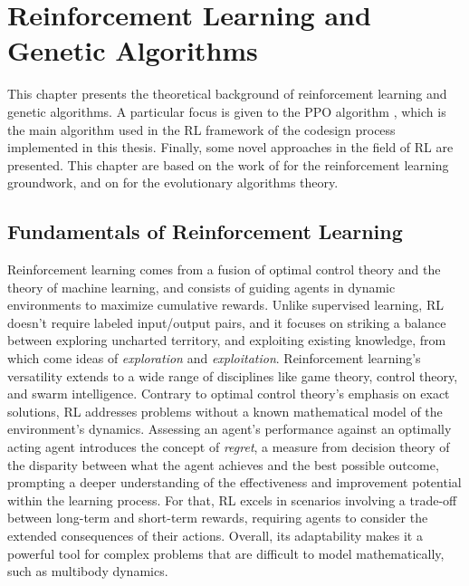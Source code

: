 \chapter{Reinforcement Learning and Genetic Algorithms}
\label{chp:back_RLGA}

This chapter presents the theoretical background of reinforcement learning and genetic algorithms. A particular focus is given to the \ac{PPO} algorithm \citep{schulman_proximal_2017}, which is the main algorithm used in the \ac{RL} framework of the codesign process implemented in this thesis. Finally, some novel approaches in the field of \ac{RL} are presented. This chapter are based on the work of \citet{sutton_reinforcement_1998,li_deep_2018,agarwal_deep_2022} for the reinforcement learning groundwork, and on \citep{holland_1992_ga} for the evolutionary algorithms theory.

\section{Fundamentals of Reinforcement Learning}

Reinforcement learning comes from a fusion of optimal control theory and the theory of machine learning, and consists of guiding agents in dynamic environments to maximize cumulative rewards. Unlike supervised learning, \ac{RL} doesn't require labeled input/output pairs, and it focuses on striking a balance between exploring uncharted territory, and exploiting existing knowledge, from which come ideas of \textit{exploration} and \textit{exploitation}. Reinforcement learning's versatility extends to a wide range of disciplines like game theory, control theory, and swarm intelligence. Contrary to optimal control theory's emphasis on exact solutions, \ac{RL} addresses problems without a known mathematical model of the environment's dynamics. Assessing an agent's performance against an optimally acting agent introduces the concept of \textit{regret}, a measure from decision theory of the disparity between what the agent achieves and the best possible outcome, prompting a deeper understanding of the effectiveness and improvement potential within the learning process. For that, \ac{RL} excels in scenarios involving a trade-off between long-term and short-term rewards, requiring agents to consider the extended consequences of their actions. Overall, its adaptability makes it a powerful tool for complex problems that are difficult to model mathematically, such as multibody dynamics.


